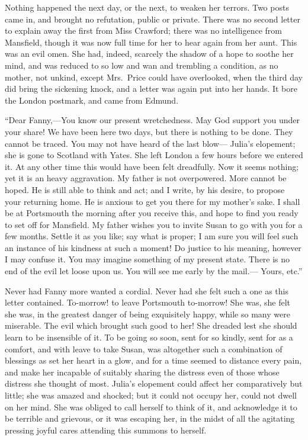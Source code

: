 Nothing happened the next day, or the next, to weaken
her terrors.  Two posts came in, and brought no refutation,
public or private.  There was no second letter to explain
away the first from Miss Crawford; there was no intelligence
from Mansfield, though it was now full time for her
to hear again from her aunt.  This was an evil omen.
She had, indeed, scarcely the shadow of a hope to soothe
her mind, and was reduced to so low and wan and trembling
a condition, as no mother, not unkind, except Mrs.\ Price
could have overlooked, when the third day did bring the
sickening knock, and a letter was again put into her hands.
It bore the London postmark, and came from Edmund.

``Dear Fanny,---You know our present wretchedness.
May God support you under your share!  We have been here
two days, but there is nothing to be done.  They cannot
be traced.  You may not have heard of the last blow---%
Julia's elopement; she is gone to Scotland with Yates.
She left London a few hours before we entered it.
At any other time this would have been felt dreadfully.
Now it seems nothing; yet it is an heavy aggravation.
My father is not overpowered.  More cannot be hoped.
He is still able to think and act; and I write,
by his desire, to propose your returning home.
He is anxious to get you there for my mother's sake.
I shall be at Portsmouth the morning after you receive this,
and hope to find you ready to set off for Mansfield.
My father wishes you to invite Susan to go with you for a
few months.  Settle it as you like; say what is proper;
I am sure you will feel such an instance of his
kindness at such a moment!  Do justice to his meaning,
however I may confuse it.  You may imagine something
of my present state.  There is no end of the evil let
loose upon us.  You will see me early by the mail.---%
Yours, etc.''

Never had Fanny more wanted a cordial.  Never had she felt
such a one as this letter contained.  To-morrow! to leave
Portsmouth to-morrow! She was, she felt she was, in the
greatest danger of being exquisitely happy, while so many
were miserable.  The evil which brought such good to her!
She dreaded lest she should learn to be insensible of it.
To be going so soon, sent for so kindly, sent for as
a comfort, and with leave to take Susan, was altogether
such a combination of blessings as set her heart in
a glow, and for a time seemed to distance every pain,
and make her incapable of suitably sharing the distress
even of those whose distress she thought of most.
Julia's elopement could affect her comparatively but little;
she was amazed and shocked; but it could not occupy her,
could not dwell on her mind.  She was obliged to call
herself to think of it, and acknowledge it to be terrible
and grievous, or it was escaping her, in the midst of all
the agitating pressing joyful cares attending this summons
to herself.

